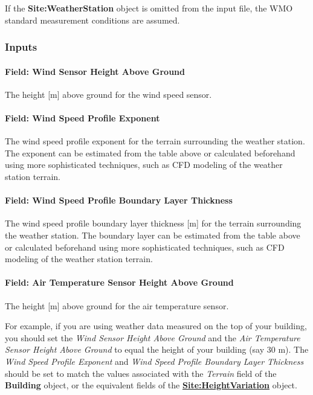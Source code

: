 If the \textbf{Site:WeatherStation} object is omitted from the input file, the WMO standard measurement conditions are assumed.

\subsubsection{Inputs}\label{inputs-9-010}

\paragraph{Field: Wind Sensor Height Above Ground}\label{field-wind-sensor-height-above-ground}

The height {[}m{]} above ground for the wind speed sensor.

\paragraph{Field: Wind Speed Profile Exponent}\label{field-wind-speed-profile-exponent}

The wind speed profile exponent for the terrain surrounding the weather station. The exponent can be estimated from the table above or calculated beforehand using more sophisticated techniques, such as CFD modeling of the weather station terrain.

\paragraph{Field: Wind Speed Profile Boundary Layer Thickness}\label{field-wind-speed-profile-boundary-layer-thickness}

The wind speed profile boundary layer thickness {[}m{]} for the terrain surrounding the weather station. The boundary layer can be estimated from the table above or calculated beforehand using more sophisticated techniques, such as CFD modeling of the weather station terrain.

\paragraph{Field: Air Temperature Sensor Height Above Ground}\label{field-air-temperature-sensor-height-above-ground}

The height {[}m{]} above ground for the air temperature sensor.

For example, if you are using weather data measured on the top of your building, you should set the \emph{Wind Sensor Height Above Ground} and the \emph{Air Temperature Sensor Height Above Ground} to equal the height of your building (say 30 m). The \emph{Wind Speed Profile Exponent} and \emph{Wind Speed Profile Boundary Layer Thickness} should be set to match the values associated with the \emph{Terrain} field of the \textbf{Building} object, or the equivalent fields of the \textbf{\hyperref[siteheightvariation]{Site:HeightVariation}} object.


